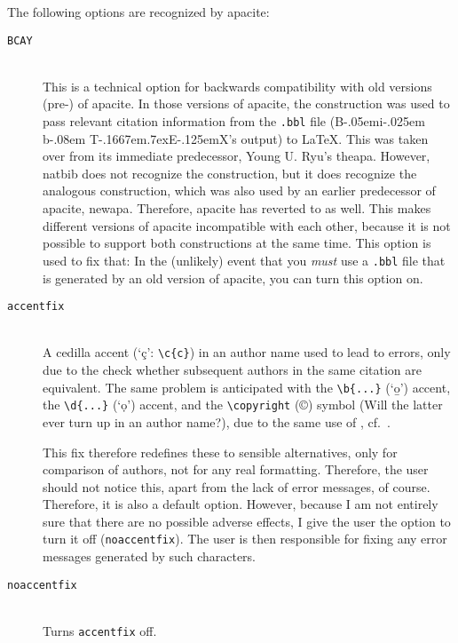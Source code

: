 \documentclass{article}
\def\BibTeX{{\rm B\kern-.05em{\sc i\kern-.025em b}\kern-.08em
    T\kern-.1667em\lower.7ex\hbox{E}\kern-.125emX}}%
\newcommand{\APACversiondate}[1]{\relax [#1]}
\newcommand{\pkg}[1]{\textsf{#1}}%
\newcommand{\fname}[1]{\texttt{#1}}%
\newcommand{\pkgoption}[1]{\texttt{#1}}%
\newcommand{\cmd}[1]{\texttt{\string#1}}%
\begin{document}
The following options are recognized by \pkg{apacite}:
\begin{description}
\item[\pkgoption{BCAY}] \mbox{}\\
  This is a technical option for backwards compatibility with old versions
  (pre-\APACversiondate{2003/09/05}) of \pkg{apacite}. In those versions of
  \pkg{apacite}, the \cmd{\BCAY} construction was used to pass relevant
  citation information from the \fname{.bbl} file (\BibTeX{}'s output) to
  \LaTeX{}. This was taken over from its immediate predecessor, Young U. Ryu's
  \pkg{theapa}. However, \pkg{natbib} does not recognize the \cmd{\BCAY}
  construction, but it does recognize the analogous \cmd{\citeauthoryear}
  construction, which was also used by an earlier predecessor of
  \pkg{apacite}, \pkg{newapa}. Therefore, \pkg{apacite} has reverted to
  \cmd{\citeauthoryear} as well. This makes different versions of
  \pkg{apacite} incompatible with each other, because it is not possible to
  support both constructions at the same time. This option is used to fix
  that: In the (unlikely) event that you \emph{must} use a \fname{.bbl} file
  that is generated by an old version of \pkg{apacite}, you can turn this
  option on.

\item[\pkgoption{accentfix}] \mbox{}\\
  A cedilla accent (`\c{c}': \verb+\c{c}+) in an author name used to lead to
  errors, only due to the check whether subsequent authors in the same
  citation are equivalent. The same problem is anticipated with the
  \verb+\b{...}+ (`\b{o}') accent, the \verb+\d{...}+ (`\d{o}') accent, and
  the \verb+\copyright+ (\copyright) symbol (Will the latter ever turn up in
  an author name?), due to the same use of \cmd{\crcr}, cf.\
  .

  This fix therefore redefines these to sensible alternatives, only for
  comparison of authors, not for any real formatting. Therefore, the user
  should not notice this, apart from the lack of error messages, of course.
  Therefore, it is also a default option. However, because I am not entirely
  sure that there are no possible adverse effects, I give the user the option
  to turn it off (\pkgoption{noaccentfix}). The user is then responsible for
  fixing any error messages generated by such characters.

\item[\pkgoption{noaccentfix}] \mbox{}\\
  Turns \pkgoption{accentfix} off.


\end{description}
\end{document}
